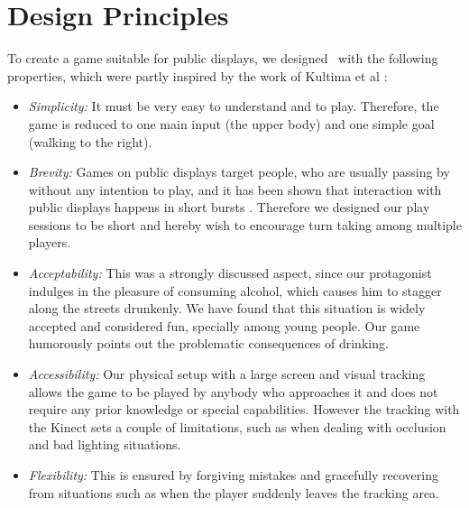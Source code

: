 \documentclass{chi-ext}
\begin{document}
%

\section{Design Principles}
%
To create a game suitable for public displays, we designed \drunkened\ with the following properties, which were partly inspired by the work of Kultima et al \cite{kultima2009casual}:
\begin{itemize}\compresslist
\item \textit{Simplicity:} It must be very easy to understand and to play. Therefore, the game is reduced to one main input (the upper body) and one simple goal (walking to the right).
\item \textit{Brevity:} Games on public displays target people, who are usually passing by without any intention to play, and it has been shown that interaction with public displays happens in short bursts \cite{walter2013strikeapose}. Therefore we designed our play sessions to be short and hereby wish to encourage turn taking among multiple players.
\item \textit{Acceptability:} This was a strongly discussed aspect, since our protagonist indulges in the pleasure of consuming alcohol, which causes him to stagger along the streets drunkenly. We have found that this situation is widely accepted and considered fun, specially among young people. Our game humorously points out the problematic consequences of drinking.
\item \textit{Accessibility:} Our physical setup with a large screen and visual tracking allows the game to be played by anybody who approaches it and does not require any prior knowledge or special capabilities. However the tracking with the Kinect sets a couple of limitations, such as when dealing with occlusion and bad lighting situations.
\item \textit{Flexibility:} This is ensured by forgiving mistakes and gracefully recovering from situations such as when the player suddenly leaves the tracking area.
\end{itemize}

\end{document}
